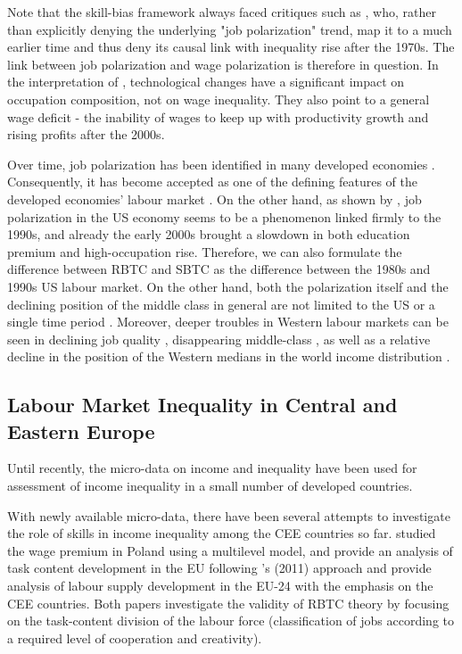 \documentclass[11pt]{article}
\begin{document}
Note that the skill-bias framework always faced critiques such as \citet{mishel2013assessing}, who, rather than explicitly denying the underlying "job polarization" trend, map it to a much earlier time and thus deny its causal link with inequality rise after the 1970s. The link between job polarization and wage polarization is therefore in question. In the interpretation of \citeauthor{mishel2013assessing}, technological changes have a significant impact on occupation composition, not on wage inequality. They also point to a general wage deficit - the inability of wages to keep up with productivity growth and rising profits after the 2000s.

 Over time, job polarization has been identified in many developed economies \citep{rodrik2020economic, oecd2017}. Consequently, it has become accepted as one of the defining features of the developed economies' labour market \citep{howell2019declining}. On the other hand, as shown by \citet{mishel2013assessing}, job polarization in the US economy seems to be a phenomenon linked firmly to the 1990s, and already the early 2000s brought a slowdown in both education premium and high-occupation rise. Therefore, we can also formulate the difference between RBTC and SBTC as the difference between the 1980s and 1990s US labour market. On the other hand, both the polarization itself and the declining position of the middle class in general are not limited to the US or a single time period \citep{temin2018vanishing, rodrik2020economic}. Moreover, deeper troubles in Western labour markets can be seen in declining job quality \citep{howell2019declining}, disappearing middle-class \citep{temin2018vanishing}, as well as a relative decline in the position of the Western medians in the world income distribution \citep{milanovic2020elephant}.



\subsection{Labour Market Inequality in Central and Eastern Europe}
Until recently, the micro-data on income and inequality have been used for assessment of income inequality in a small number of developed countries.

With newly available micro-data, there have been several attempts to investigate the role of skills in income inequality among the CEE countries so far. \citet{arendt2019technical} studied the wage premium in Poland using a multilevel model, and \citet{hardy2018educational} provide an analysis of task content development in the EU following \citeauthor{acemoglu2011skills}'s (2011) approach and provide analysis of labour supply development in the EU-24 with the emphasis on the CEE countries. Both papers investigate the validity of RBTC theory by focusing on the task-content division of the labour force (classification of jobs according to a required level of cooperation and creativity).
\end{document}
